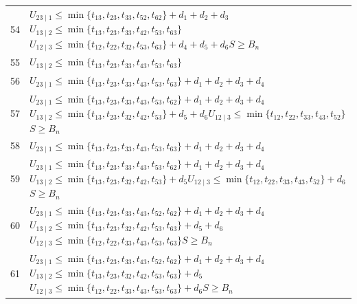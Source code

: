 \documentclass[a4paper,11pt]{amsart}
\numberwithin{equation}{section}
\theoremstyle{definition}
\theoremstyle{remark}
\begin{document}
{\begin{longtable}{@{}r>{\raggedright\arraybackslash}p{12.9cm}@{}}
54 & \(U_{23\mid 1}\leq \min\{t_{13},t_{23},t_{33},t_{52},t_{62}\}+d_{1}+d_{2}+d_{3}\)\newline \(U_{13\mid 2}\leq \min\{t_{13},t_{23},t_{33},t_{42},t_{53},t_{63}\}\)\newline \(U_{12\mid 3}\leq \min\{t_{12},t_{22},t_{32},t_{53},t_{63}\}+d_{4}+d_{5}+d_{6}\)\newline \(S\geq B_n\)\\[3pt]
55 & \(U_{13\mid 2}\leq \min\{t_{13},t_{23},t_{33},t_{43},t_{53},t_{63}\}\)\\[3pt]
56 & \(U_{23\mid 1}\leq \min\{t_{13},t_{23},t_{33},t_{43},t_{53},t_{63}\}+d_{1}+d_{2}+d_{3}+d_{4}\)\\[3pt]
57 & \(U_{23\mid 1}\leq \min\{t_{13},t_{23},t_{33},t_{43},t_{53},t_{62}\}+d_{1}+d_{2}+d_{3}+d_{4}\)\newline \(U_{13\mid 2}\leq \min\{t_{13},t_{23},t_{32},t_{42},t_{53}\}+d_{5}+d_{6}\)\newline \(U_{12\mid 3}\leq \min\{t_{12},t_{22},t_{33},t_{43},t_{52}\}\)\newline \(S\geq B_n\)\\[3pt]
58 & \(U_{23\mid 1}\leq \min\{t_{13},t_{23},t_{33},t_{43},t_{53},t_{63}\}+d_{1}+d_{2}+d_{3}+d_{4}\)\\[3pt]
59 & \(U_{23\mid 1}\leq \min\{t_{13},t_{23},t_{33},t_{43},t_{53},t_{62}\}+d_{1}+d_{2}+d_{3}+d_{4}\)\newline \(U_{13\mid 2}\leq \min\{t_{13},t_{23},t_{32},t_{42},t_{53}\}+d_{5}\)\newline \(U_{12\mid 3}\leq \min\{t_{12},t_{22},t_{33},t_{43},t_{52}\}+d_{6}\)\newline \(S\geq B_n\)\\[3pt]
60 & \(U_{23\mid 1}\leq \min\{t_{13},t_{23},t_{33},t_{43},t_{52},t_{62}\}+d_{1}+d_{2}+d_{3}+d_{4}\)\newline \(U_{13\mid 2}\leq \min\{t_{13},t_{23},t_{32},t_{42},t_{53},t_{63}\}+d_{5}+d_{6}\)\newline \(U_{12\mid 3}\leq \min\{t_{12},t_{22},t_{33},t_{43},t_{53},t_{63}\}\)\newline \(S\geq B_n\)\\[3pt]
61 & \(U_{23\mid 1}\leq \min\{t_{13},t_{23},t_{33},t_{43},t_{52},t_{62}\}+d_{1}+d_{2}+d_{3}+d_{4}\)\newline \(U_{13\mid 2}\leq \min\{t_{13},t_{23},t_{32},t_{42},t_{53},t_{63}\}+d_{5}\)\newline \(U_{12\mid 3}\leq \min\{t_{12},t_{22},t_{33},t_{43},t_{53},t_{63}\}+d_{6}\)\newline \(S\geq B_n\)\\[3pt]

\end{longtable}}
\end{document}
